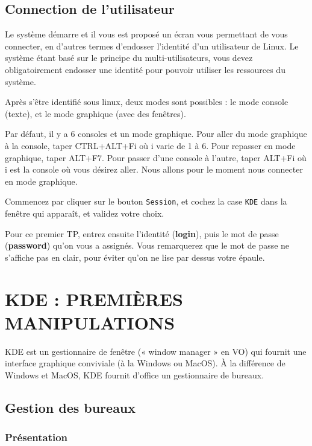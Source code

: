 \documentclass[12pt,a4paper]{article}
\begin{document}
 \subsection{Connection de l'utilisateur}

   Le système démarre et il vous est proposé un écran vous permettant
   de vous connecter, en d'autres termes d'endosser l'identité d'un
   utilisateur de Linux. Le système étant basé sur le principe du
   multi-utilisateurs, vous devez obligatoirement endosser une
   identité pour pouvoir utiliser les ressources du système. 

   Après s'être identifié sous linux, deux modes sont possibles : le
   mode console (texte), et le mode graphique (avec des fenêtres).

   Par défaut, il y a 6 consoles et un mode graphique. Pour aller du
   mode graphique à la console, taper CTRL+ALT+Fi où i varie de 1 à
   6. Pour repasser en mode graphique, taper ALT+F7. Pour passer d'une
   console à l'autre, taper ALT+Fi où i est la console où vous désirez
   aller.    Nous allons pour le moment nous connecter en mode
   graphique.

   Commencez par cliquer sur le bouton {\tt Session}, et cochez la
   case {\tt KDE} dans la fenêtre qui apparaît, et validez votre
   choix.

   Pour ce premier TP, entrez ensuite l'identité ({\bf login}),
   puis le mot de passe ({\bf password}) qu'on vous a assignés.
   Vous remarquerez que le mot de passe ne s'affiche
   pas en clair, pour éviter qu'on ne lise par dessus votre épaule.



\section{KDE : PREMIÈRES MANIPULATIONS}

KDE est un gestionnaire de fenêtre (« window manager » en VO) qui fournit une interface
graphique conviviale (à la Windows ou MacOS). À la différence de Windows et MacOS, KDE
fournit d'office un gestionnaire de bureaux.

\subsection{Gestion des bureaux}

\subsubsection{Présentation}
 
\end{document}

